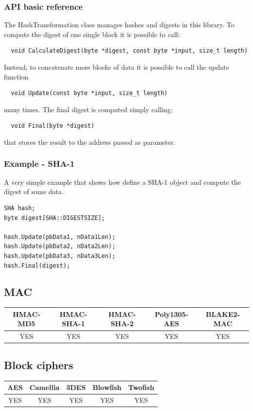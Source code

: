 \subsubsection*{API basic reference}
The HashTransformation class manages hashes and digests in this library. To compute the digest of one single block it is possible to call:
\begin{verbatim}
  void CalculateDigest(byte *digest, const byte *input, size_t length)
\end{verbatim}
Instead, to concatenate more blocks of data it is possible to call the update function
\begin{verbatim}
  void Update(const byte *input, size_t length)
\end{verbatim}
many times. The final digest is computed simply calling:
\begin{verbatim}
  void Final(byte *digest)
\end{verbatim}
that stores the result to the address passed as parameter.
\subsubsection*{Example - SHA-1}
A very simple example that shows how define a SHA-1 object and compute the digest of some data.
\begin{verbatim}
SHA hash;
byte digest[SHA::DIGESTSIZE];

hash.Update(pbData1, nData1Len);
hash.Update(pbData2, nData2Len);
hash.Update(pbData3, nData3Len);
hash.Final(digest);
\end{verbatim}

\newpage
\subsection{MAC}
\begin{table}[!ht]
	\begin{tabular}{|| c | c | c | c | c ||}
		\textbf{HMAC-MD5} & \textbf{HMAC-SHA-1} & \textbf{HMAC-SHA-2} & \textbf{Poly1305-AES} & \textbf{BLAKE2-MAC} \\
		\hline \hline
		YES & YES & YES & YES & YES \\
	\end{tabular}
\end{table}

\subsection{Block ciphers}
\begin{table}[!h]
	\begin{tabular}{|| c | c | c | c | c ||}
		\textbf{AES} & \textbf{Camellia} & \textbf{3DES} & \textbf{Blowfish} & \textbf{Twofish} \\
		\hline \hline
		YES & YES & YES & YES & YES \\
	\end{tabular}
\end{table}

